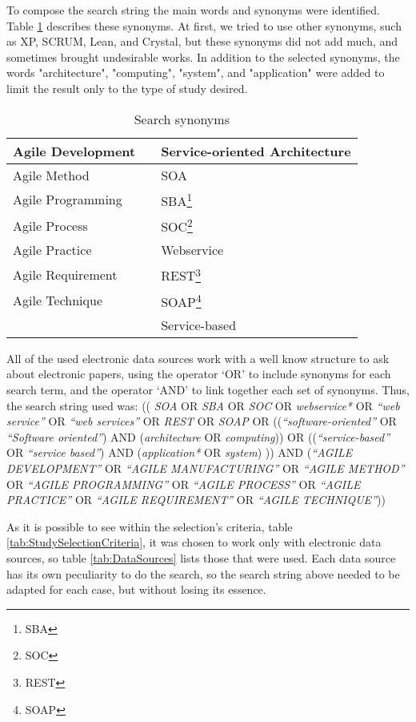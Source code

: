 To compose the search string the main words and synonyms were identified. Table \ref{tab:SearchSynonyms} describes these synonyms. At first, we tried to use other synonyms, such as \acrfull{XP}, SCRUM, Lean, and Crystal, but these synonyms did not add much, and sometimes brought undesirable works. In addition to the selected synonyms, the words "architecture", "computing", "system", and "application" were added to limit the result only to the type of study desired.

\begin{table}[ht]
\begin{tabular}{lll}
\hline
Agile Development & & Service-oriented Architecture \\ \hline
Agile Method & & SOA \\
Agile Programming & & SBA\footnote{\acrfull{SBA}} \\
Agile Process & & SOC\footnote{\acrfull{SOC}} \\
Agile Practice & & Webservice \\
Agile Requirement & & REST\footnote{\acrfull{REST}} \\
Agile Technique & & SOAP\footnote{\acrfull{SOAP}} \\
 & & Service-based \\ \hline
\end{tabular}
\caption{Search synonyms}
\label{tab:SearchSynonyms}
\end{table}

All of the used electronic data sources work with a well know structure to ask about electronic papers, using the operator `OR' to include synonyms for each search term, and the operator `AND' to link together each set of synonyms. Thus, the search string used was:
((
\textit{SOA} OR \textit{SBA} OR \textit{SOC} OR \textit{webservice*} OR \textit{``web service''} OR \textit{``web services''} OR \textit{REST} OR \textit{SOAP} 
OR 
((\textit{``software-oriented''} OR \textit{``Software oriented''}) AND (\textit{architecture} OR \textit{computing})) 
OR 
((\textit{``service-based''} OR \textit{``service based''}) AND (\textit{application*} OR \textit{system})
)) 
AND 
(\textit{``AGILE DEVELOPMENT''} OR \textit{``AGILE MANUFACTURING''} OR \textit{``AGILE METHOD''} OR \textit{``AGILE PROGRAMMING''} OR \textit{``AGILE PROCESS''} OR \textit{``AGILE PRACTICE''} OR \textit{``AGILE REQUIREMENT''} OR \textit{``AGILE TECHNIQUE''}))

As it is possible to see within the selection's criteria, table \ref{tab:StudySelectionCriteria}, it was chosen to work only with electronic data sources, so table \ref{tab:DataSources} lists those that were used. Each data source has its own peculiarity to do the search, so the search string above needed to be adapted for each case, but without losing its essence.

